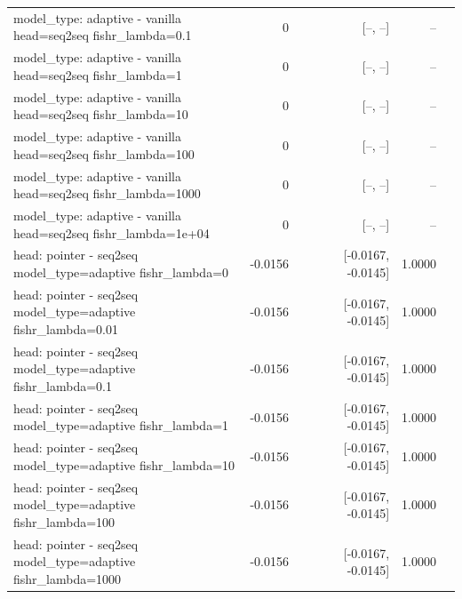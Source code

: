 \documentclass[10pt]{article}
\makeatletter
\newcommand{\stackcell}[1]{\begin{tabular}[t]{@{}l@{}}#1\end{tabular}}
\makeatother
\begin{document}
{\begin{longtable}{lrrrl}
\stackcell{model\_type: adaptive - vanilla\\\footnotesize head=seq2seq fishr\_lambda=0.1 } & 0 & [--, --] & -- & \\
\stackcell{model\_type: adaptive - vanilla\\\footnotesize head=seq2seq fishr\_lambda=1 } & 0 & [--, --] & -- & \\
\stackcell{model\_type: adaptive - vanilla\\\footnotesize head=seq2seq fishr\_lambda=10 } & 0 & [--, --] & -- & \\
\stackcell{model\_type: adaptive - vanilla\\\footnotesize head=seq2seq fishr\_lambda=100 } & 0 & [--, --] & -- & \\
\stackcell{model\_type: adaptive - vanilla\\\footnotesize head=seq2seq fishr\_lambda=1000 } & 0 & [--, --] & -- & \\
\stackcell{model\_type: adaptive - vanilla\\\footnotesize head=seq2seq fishr\_lambda=1e+04 } & 0 & [--, --] & -- & \\
\stackcell{head: pointer - seq2seq\\\footnotesize model\_type=adaptive fishr\_lambda=0 } & -0.0156 & [-0.0167, -0.0145] & 1.0000 & \\
\stackcell{head: pointer - seq2seq\\\footnotesize model\_type=adaptive fishr\_lambda=0.01 } & -0.0156 & [-0.0167, -0.0145] & 1.0000 & \\
\stackcell{head: pointer - seq2seq\\\footnotesize model\_type=adaptive fishr\_lambda=0.1 } & -0.0156 & [-0.0167, -0.0145] & 1.0000 & \\
\stackcell{head: pointer - seq2seq\\\footnotesize model\_type=adaptive fishr\_lambda=1 } & -0.0156 & [-0.0167, -0.0145] & 1.0000 & \\
\stackcell{head: pointer - seq2seq\\\footnotesize model\_type=adaptive fishr\_lambda=10 } & -0.0156 & [-0.0167, -0.0145] & 1.0000 & \\
\stackcell{head: pointer - seq2seq\\\footnotesize model\_type=adaptive fishr\_lambda=100 } & -0.0156 & [-0.0167, -0.0145] & 1.0000 & \\
\stackcell{head: pointer - seq2seq\\\footnotesize model\_type=adaptive fishr\_lambda=1000 } & -0.0156 & [-0.0167, -0.0145] & 1.0000 & \\

\end{longtable}}
\end{document}
